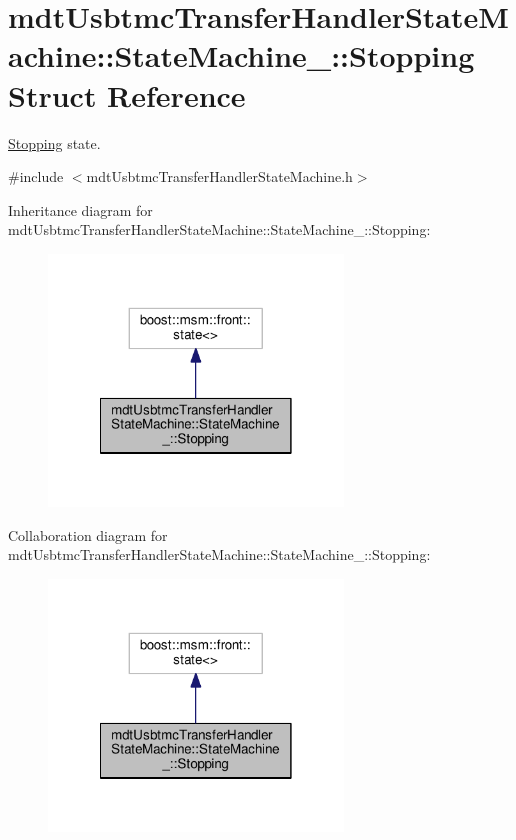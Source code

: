\hypertarget{structmdt_usbtmc_transfer_handler_state_machine_1_1_state_machine___1_1_stopping}{\section{mdt\-Usbtmc\-Transfer\-Handler\-State\-Machine\-:\-:State\-Machine\-\_\-\-:\-:Stopping Struct Reference}
\label{structmdt_usbtmc_transfer_handler_state_machine_1_1_state_machine___1_1_stopping}
}


\hyperlink{structmdt_usbtmc_transfer_handler_state_machine_1_1_state_machine___1_1_stopping}{Stopping} state.  




{\ttfamily \#include $<$mdt\-Usbtmc\-Transfer\-Handler\-State\-Machine.\-h$>$}



Inheritance diagram for mdt\-Usbtmc\-Transfer\-Handler\-State\-Machine\-:\-:State\-Machine\-\_\-\-:\-:Stopping\-:
\nopagebreak
\begin{figure}[H]
\begin{center}
\leavevmode
\includegraphics[width=222pt]{structmdt_usbtmc_transfer_handler_state_machine_1_1_state_machine___1_1_stopping__inherit__graph}
\end{center}
\end{figure}


Collaboration diagram for mdt\-Usbtmc\-Transfer\-Handler\-State\-Machine\-:\-:State\-Machine\-\_\-\-:\-:Stopping\-:
\nopagebreak
\begin{figure}[H]
\begin{center}
\leavevmode
\includegraphics[width=222pt]{structmdt_usbtmc_transfer_handler_state_machine_1_1_state_machine___1_1_stopping__coll__graph}
\end{center}
\end{figure}

